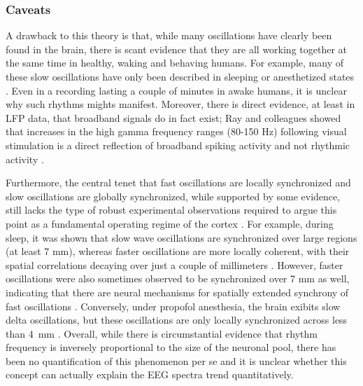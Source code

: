 \subsubsection{Caveats}
A drawback to this theory is that, while many oscillations have clearly been found in the brain, there is scant evidence that they are all working together at the same time in healthy, waking and behaving humans. For example, many of these slow oscillations have only been described in sleeping or anesthetized states \cite{Hromadka2013}. Even in a recording lasting a couple of minutes in awake humans, it is unclear why such rhythms mights manifest. Moreover, there is direct evidence, at least in LFP data, that broadband signals do in fact exist; Ray and colleagues showed that increases in the high gamma frequency ranges (80-150 Hz) following visual stimulation is a direct reflection of broadband spiking activity and not rhythmic activity \cite{Ray2008,Ray2011}. 

Furthermore, the central tenet that fast oscillations are locally synchronized and slow oscillations are globally synchronized, while supported by some evidence, still lacks the type of robust experimental observations required to argue this point as a fundamental operating regime of the cortex \cite{Buzsaki2006}. For example, during sleep, it was shown that slow wave oscillations are synchronized over large regions (at least 7 mm), whereas faster oscillations are more locally coherent, with their spatial correlations decaying over just a couple of millimeters \cite{Destexhe1999}. However, faster oscillations were also sometimes observed to be synchronized over 7 mm as well, indicating that there are neural mechanisms for spatially extended synchrony of fast oscillations \cite{Destexhe1999}. Conversely, under propofol anesthesia, the brain exibits slow delta oscillations, but these oscillations are only locally synchronized across less than \qty{4}{\milli\meter} \cite{Lewis2012}. Overall, while there is circumstantial evidence that rhythm frequency is inversely proportional to the size of the neuronal pool, there has been no quantification of this phenomenon per se and it is unclear whether this concept can actually explain the EEG spectra trend quantitatively.

